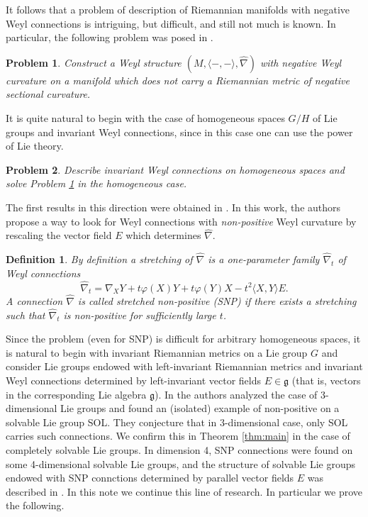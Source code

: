 \documentclass[12pt]{article}
\newtheorem{definition}{Definition}
\newtheorem{problem}{Problem}
\begin{document}
 It follows that a problem of  description of Riemannian manifolds with negative Weyl connections is intriguing, but difficult, and still not much is known. In particular, the following problem was posed in \cite{W}.         

\begin{problem}\label{probl-gen}
 Construct a Weyl structure $(M,\langle -,-\rangle,\widehat{\nabla})$ with negative Weyl curvature on a manifold which does not carry a Riemannian metric of negative sectional curvature.
\end{problem}
It is quite natural to begin with the case of homogeneous spaces $G/H$ of Lie groups and invariant Weyl connections, since in this case one can use the power of Lie theory. 
\begin{problem}\label{probl:inv}
Describe invariant Weyl connections on homogeneous spaces and solve Problem \ref{probl-gen} in the homogeneous case. 
\end{problem}
The first results in this direction were obtained in \cite{TW}. In this work, the authors propose a way to look for Weyl connections with {\it non-positive} Weyl curvature by rescaling the vector field $E$ which determines $\widehat{\nabla}$.   
\begin{definition} {\rm By definition a {\it stretching} of $\widehat{\nabla}$ is a one-parameter  family $\widehat{\nabla}_t$ of Weyl connections}
$$\widehat{\nabla}_t=\nabla_XY+t\varphi(X)Y+t\varphi(Y)X-t^2\langle X, Y\rangle E.$$
A connection $\widehat{\nabla}$ is called stretched non-positive (SNP) if there exists a stretching such that $\widehat{\nabla}_t$ is non-positive for sufficiently large $t$.
\end{definition}     
Since the problem (even for SNP) is difficult for arbitrary homogeneous spaces, it is natural to begin with invariant Riemannian metrics on a Lie group $G$  and consider  Lie groups endowed with left-invariant Riemannian metrics and invariant Weyl connections determined by left-invariant vector fields $E\in\mathfrak{g}$ (that is, vectors in the corresponding Lie algebra $\mathfrak{g}$). In \cite {TW} the authors analyzed the case of 3-dimensional Lie groups and found an (isolated) example of non-positive on a solvable Lie group SOL. They conjecture that in 3-dimensional case, only SOL carries such connections. We confirm this in Theorem \ref{thm:main} in the case of completely solvable Lie groups.  In dimension 4,  SNP connections were found on some 4-dimensional solvable Lie groups, and the structure of solvable Lie groups endowed with SNP connctions determined by parallel vector fields $E$ was described in \cite{BJT}. In this note we continue this line of research. In particular we prove the following. 
\end{document}
